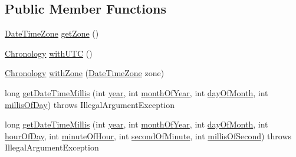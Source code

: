 \subsection*{Public Member Functions}
\begin{DoxyCompactItemize}
\item 
\hyperlink{classorg_1_1joda_1_1time_1_1_date_time_zone}{Date\-Time\-Zone} \hyperlink{classorg_1_1joda_1_1time_1_1chrono_1_1_zoned_chronology_a9338a709576723f0e06be50b91929d9d}{get\-Zone} ()
\item 
\hyperlink{classorg_1_1joda_1_1time_1_1_chronology}{Chronology} \hyperlink{classorg_1_1joda_1_1time_1_1chrono_1_1_zoned_chronology_af4c31d7f1dc797e95024bfd480cf2af9}{with\-U\-T\-C} ()
\item 
\hyperlink{classorg_1_1joda_1_1time_1_1_chronology}{Chronology} \hyperlink{classorg_1_1joda_1_1time_1_1chrono_1_1_zoned_chronology_ad193ee3a2c8a683d1d61d9bf4ebe8883}{with\-Zone} (\hyperlink{classorg_1_1joda_1_1time_1_1_date_time_zone}{Date\-Time\-Zone} zone)
\item 
long \hyperlink{classorg_1_1joda_1_1time_1_1chrono_1_1_zoned_chronology_afbe07746ce4bcf1f4356a63381ebd98f}{get\-Date\-Time\-Millis} (int \hyperlink{classorg_1_1joda_1_1time_1_1chrono_1_1_assembled_chronology_aa1e3d4efcbe5275257c7815e4816561a}{year}, int \hyperlink{classorg_1_1joda_1_1time_1_1chrono_1_1_assembled_chronology_a838ab0bb1ded0d1dc6d53f307297c58c}{month\-Of\-Year}, int \hyperlink{classorg_1_1joda_1_1time_1_1chrono_1_1_assembled_chronology_a6aa5f9a31841b1ffa448660d36967f92}{day\-Of\-Month}, int \hyperlink{classorg_1_1joda_1_1time_1_1chrono_1_1_assembled_chronology_afccb0dba308d68f09089bff55f2849ed}{millis\-Of\-Day})  throws Illegal\-Argument\-Exception     
\item 
long \hyperlink{classorg_1_1joda_1_1time_1_1chrono_1_1_zoned_chronology_a2dba009349887c20320131e7b930a803}{get\-Date\-Time\-Millis} (int \hyperlink{classorg_1_1joda_1_1time_1_1chrono_1_1_assembled_chronology_aa1e3d4efcbe5275257c7815e4816561a}{year}, int \hyperlink{classorg_1_1joda_1_1time_1_1chrono_1_1_assembled_chronology_a838ab0bb1ded0d1dc6d53f307297c58c}{month\-Of\-Year}, int \hyperlink{classorg_1_1joda_1_1time_1_1chrono_1_1_assembled_chronology_a6aa5f9a31841b1ffa448660d36967f92}{day\-Of\-Month}, int \hyperlink{classorg_1_1joda_1_1time_1_1chrono_1_1_assembled_chronology_a7bb60a080dea96b8103a530f88a4fb54}{hour\-Of\-Day}, int \hyperlink{classorg_1_1joda_1_1time_1_1chrono_1_1_assembled_chronology_afae2a5fd2073af85a1d2008d98313da7}{minute\-Of\-Hour}, int \hyperlink{classorg_1_1joda_1_1time_1_1chrono_1_1_assembled_chronology_adc867c7197cd2ae0d480003d22d9fdb7}{second\-Of\-Minute}, int \hyperlink{classorg_1_1joda_1_1time_1_1chrono_1_1_assembled_chronology_a16f1e731a421127a787ac71ffded4387}{millis\-Of\-Second})  throws Illegal\-Argument\-Exception     

\end{DoxyCompactItemize}
